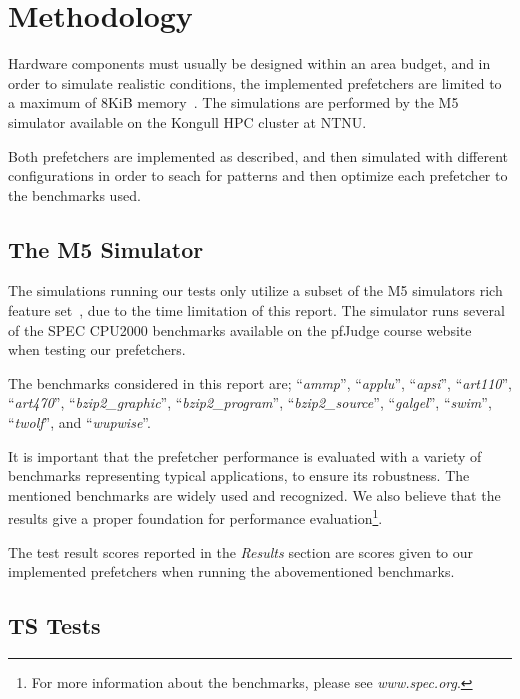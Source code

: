 \section{Methodology}

Hardware components must usually be designed within an area budget, and in order
to simulate realistic conditions, the implemented prefetchers are limited to a
maximum of 8KiB memory~\cite{guidelines}. The simulations are performed by the
M5 simulator available on the Kongull HPC cluster at NTNU.

Both prefetchers are implemented as described, and then simulated with different
configurations in order to seach for patterns and then optimize each prefetcher
to the benchmarks used.

\subsection{The M5 Simulator}

The simulations running our tests only utilize a subset of the M5 simulators
rich feature set~\cite{user_doc}, due to the time limitation of this report. The
simulator runs several of the SPEC CPU2000 benchmarks available on the pfJudge
course website~\cite{guidelines} when testing our prefetchers.

The benchmarks considered in this report are; ``\emph{ammp}'', ``\emph{applu}'',
``\emph{apsi}'', ``\emph{art110}'', ``\emph{art470}'',
``\emph{bzip2\_graphic}'', ``\emph{bzip2\_program}'', ``\emph{bzip2\_source}'',
``\emph{galgel}'', ``\emph{swim}'', ``\emph{twolf}'', and ``\emph{wupwise}''.

It is important that the prefetcher performance is evaluated with a variety of
benchmarks representing typical applications, to ensure its robustness. The
mentioned benchmarks are widely used and recognized. We also believe that the
results give a proper foundation for performance evaluation\footnote{For more
information about the benchmarks, please see \emph{www.spec.org}.}.

The test result scores reported in the \textit{Results} section are scores given
to our implemented prefetchers when running the abovementioned benchmarks.


\subsection{TS Tests}

